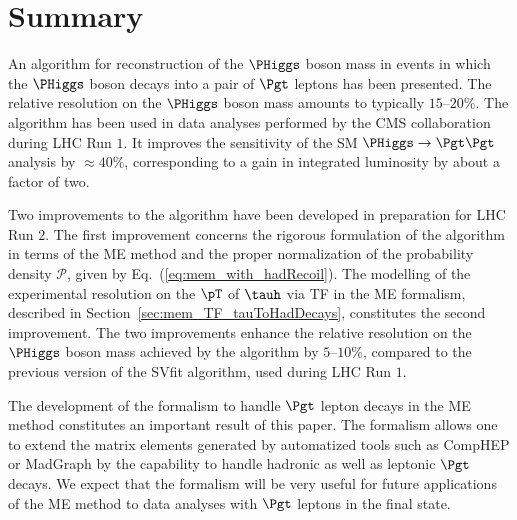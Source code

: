 \section{Summary}
\label{sec:summary}

An algorithm for reconstruction of the $\PHiggs$ boson mass in events
in which the $\PHiggs$ boson decays into a pair of $\Pgt$ leptons has been
presented.
The relative resolution on the $\PHiggs$ boson mass amounts to typically
$15$--$20\%$.
The algorithm has been used in data analyses performed by the CMS
collaboration during LHC Run $1$.
It improves the sensitivity of the SM $\PHiggs \to \Pgt\Pgt$ analysis by $\approx 40\%$,
corresponding to a gain in integrated luminosity by about a factor of two.

Two improvements to the algorithm have been developed in preparation
for LHC Run $2$.
The first improvement concerns the rigorous formulation of the
algorithm in terms of the ME method
and the proper normalization of the probability density 
$\mathcal{P}$, given by Eq.~(\ref{eq:mem_with_hadRecoil}).
The modelling of the experimental resolution on the $\pT$ of $\tauh$ via TF in the ME
formalism, described in Section~\ref{sec:mem_TF_tauToHadDecays}, constitutes the second improvement.
The two improvements enhance the relative resolution on the $\PHiggs$ boson mass
achieved by the algorithm by $5$--$10\%$, 
compared to the previous version of the SVfit algorithm, used during LHC Run $1$.

The development of the formalism to handle $\Pgt$ lepton decays
in the ME method constitutes an important result of this paper.
The formalism allows one to extend the matrix elements generated by automatized tools such as
CompHEP or MadGraph by the capability to handle hadronic as well as leptonic $\Pgt$ decays.
We expect that the formalism will be very useful for future
applications of the ME method to data analyses with $\Pgt$ leptons in
the final state. 
